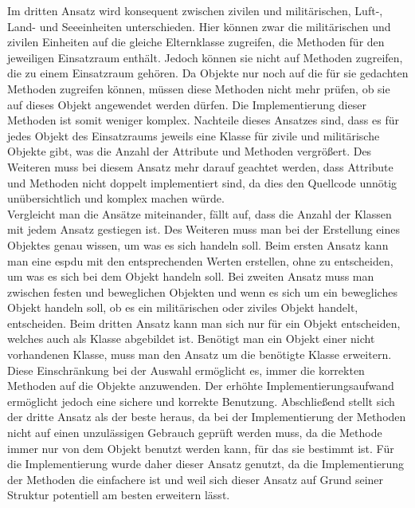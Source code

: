 Im dritten Ansatz wird konsequent zwischen zivilen und militärischen, Luft-, Land- und Seeeinheiten unterschieden. Hier können zwar die militärischen und zivilen Einheiten auf die gleiche Elternklasse zugreifen, die Methoden für den jeweiligen Einsatzraum enthält. Jedoch können sie nicht auf Methoden zugreifen, die zu einem Einsatzraum gehören. Da Objekte nur noch auf die für sie gedachten Methoden zugreifen können, müssen diese Methoden nicht mehr prüfen, ob sie auf dieses Objekt angewendet werden dürfen. Die Implementierung dieser Methoden ist somit weniger komplex. Nachteile dieses Ansatzes sind, dass es für jedes Objekt des Einsatzraums jeweils eine Klasse für zivile und militärische Objekte gibt, was die Anzahl der Attribute und Methoden vergrößert. Des Weiteren  muss bei diesem Ansatz mehr darauf geachtet werden, dass Attribute und Methoden  nicht doppelt implementiert sind, da dies den Quellcode unnötig unübersichtlich und komplex machen würde. 
\\
Vergleicht man die Ansätze miteinander, fällt auf, dass die Anzahl der Klassen mit jedem Ansatz gestiegen ist. Des Weiteren muss man bei der Erstellung eines Objektes genau wissen, um was es sich handeln soll.
Beim ersten Ansatz kann man eine \ac{espdu} mit den entsprechenden Werten erstellen, ohne zu entscheiden, um was es sich bei dem Objekt handeln soll. Bei zweiten Ansatz muss man zwischen festen und beweglichen Objekten und wenn es sich um ein bewegliches Objekt handeln soll, ob es ein militärischen oder ziviles Objekt handelt, entscheiden. Beim dritten Ansatz kann man sich nur für ein Objekt entscheiden, welches auch als Klasse abgebildet ist. Benötigt man ein Objekt einer nicht vorhandenen Klasse, muss man den Ansatz um die benötigte Klasse erweitern. Diese Einschränkung bei der Auswahl ermöglicht es, immer die korrekten Methoden auf die Objekte anzuwenden. Der erhöhte Implementierungsaufwand ermöglicht jedoch eine sichere und korrekte Benutzung. 
Abschließend stellt sich der dritte Ansatz als der beste heraus, da bei der Implementierung der Methoden nicht auf einen unzulässigen Gebrauch geprüft werden muss, da die Methode immer nur von dem Objekt benutzt werden kann, für das sie bestimmt ist. Für die Implementierung wurde daher dieser Ansatz genutzt, da die Implementierung der Methoden die einfachere ist und weil sich dieser Ansatz auf Grund seiner Struktur  potentiell am  besten erweitern lässt.  

